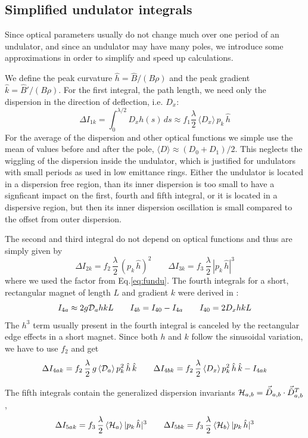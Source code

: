 \documentclass[12pt]{article}
\newcommand\beq{\begin{equation}}
\newcommand\eeq{\end{equation}}
\newcommand{\tilvec}[1]{\vec{\tilde{#1}}}
\begin{document}
\subsection{\label{ssecurad}Simplified undulator integrals}
Since optical parameters usually do not change much over one period of an undulator, and since an undulator may have many poles, we introduce some approximations in order to simplify and speed up calculations.

We define the peak curvature $\hat{h}= \hat{B}/(B\rho)$ and the peak gradient $\hat k = \hat{B}'/(B\rho)$.
For the first integral, the path length, we need only the dispersion in the direction of deflection, i.e. $D_x$:
\beq
\Delta I_{1k} = \int_0^{\lambda/2} D_x h(s)\,ds \approx f_1 \frac{\lambda}{2}\,\langle D_x \rangle \,p_k\,\hat{h}
\eeq
For the average of the dispersion and other optical functions we simple use the mean of values before and after the pole, $\langle D \rangle \approx (D_0+D_1)/2$. This neglects the wiggling of the dispersion inside the undulator, which is justified for undulators with small periods as used in low emittance rings. Either the undulator is located in a dispersion free region, than its inner dispersion is too small to have a signficant impact on the first, fourth and fifth integral, or it is located in a dispersive region, but then its inner dispersion oscillation is small compared to the offset from outer dispersion.

The second and third integral do not depend on optical functions and thus are simply given by
\beq
\Delta I_{2k} = f_2\, \frac{\lambda}{2}\, (p_k\,\hat{h})^2 \qquad   \Delta I_{3k} = f_3\, \frac{\lambda}{2}\, |p_k\,\hat{h}|^3
\eeq
where we used the factor from Eq.\ref{eq:fundu}.
The fourth integrals for a short, rectangular magnet of length $L$ and gradient $k$ were derived in \cite{VZAS}:
\beq
I_{4a}  \approx  2 g {\cal D}_a  h k L\qquad I_{4b} = I_{40}-I_{4a}\qquad I_{40} = 2 D_x h k L
\eeq
The $h^3$ term usually present in the fourth integral is canceled by the rectangular edge effects in a short magnet.
Since both $h$ and $k$ follow the sinusoidal variation, we have to use $f_2$ and get
\beq
\Delta I_{4ak} = f_2\, \frac{\lambda}{2}\, g\, \langle {\cal D}_a \rangle\, p_k^2\,\hat{h}\,\hat{k}\qquad
\Delta I_{4bk} = f_2\, \frac{\lambda}{2}\, \langle {D_x} \rangle\, p_k^2\,\hat{h}\,\hat{k} - I_{4ak}
\eeq

The fifth integrals contain the generalized dispersion invariants
${\cal H}_{a,b} = \tilvec{D}_{a,b}\cdot \tilvec{D}_{a,b}^T$,
\beq
\Delta I_{5ak} = f_3\, \frac{\lambda}{2}\,\langle {\cal H}_a \rangle\, |p_k\,\hat{h}|^3\qquad
\Delta I_{5bk} = f_3\, \frac{\lambda}{2}\,\langle {\cal H}_b \rangle\, |p_k\,\hat{h}|^3
\eeq
\end{document}
